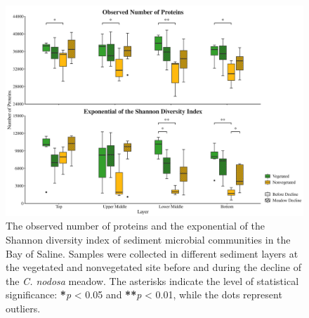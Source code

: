 \documentclass[
  12 pt,
]{article}
\begin{document}
\begin{figure}[H]

{\centering \includegraphics[width=1\linewidth]{../results/figures/alpha} 

}

\caption{The observed number of proteins and the exponential of the Shannon diversity index of sediment microbial communities in the Bay of Saline. Samples were collected in different sediment layers at the vegetated and nonvegetated site before and during the decline of the \emph{C. nodosa} meadow. The asterisks indicate the level of statistical significance: \textbf{*}\emph{p} \textless{} 0.05 and \textbf{**}\emph{p} \textless{} 0.01, while the dots represent outliers.}\label{fig:alpha}
\end{figure}
\end{document}
